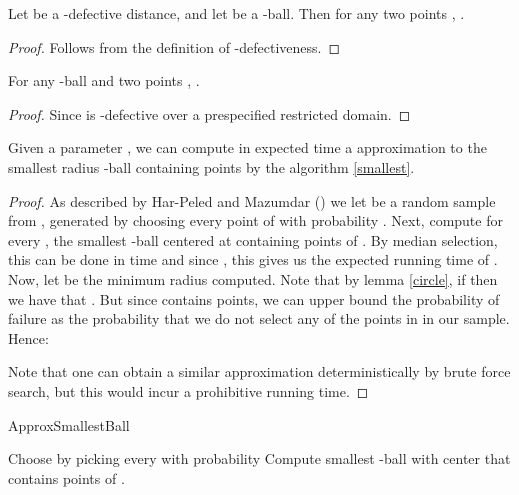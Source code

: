 \documentclass[11pt]{myclass}
\begin{document}
\begin{lemma} \label{circle}
Let  be a -defective distance, and let  be a -ball. Then for any two points , .
\end{lemma}
\begin{proof}
 Follows from the definition of  -defectiveness.
  
 \end{proof}
 
 \begin{corollary}
 For any -ball  and two points ,
 . 
 \end{corollary}
\begin{proof}
Since  is -defective over a prespecified restricted domain.
\end{proof}

\begin{lemma} \label{randommufraction}
 Given a parameter , we can compute in  expected time a  approximation to the smallest  
radius -ball containing  points by the algorithm \ref{smallest}. 
\end{lemma}
\begin{proof}
As described by Har-Peled and Mazumdar (\cite{smallestdisk}) we let  be a random sample from , generated by choosing every point of  with probability . Next, compute for every , the
smallest -ball centered at  containing  points of . By median selection, this can be done in  time and since , this gives us
the expected running time of . Now, let  be the minimum radius computed.
Note that by lemma \ref{circle}, if  then we have that .
 But since  contains  points, we can upper bound the probability of
 failure as the probability that we do not select any of the  points in  in our
sample. Hence:



Note that one can obtain a similar approximation deterministically by brute force search, but this would incur a prohibitive
 running time.
\end{proof}

\begin{algorithm}
  \caption{ApproxSmallestBall}
  \begin{algorithmic}
  	\STATE  
    \STATE Choose  by picking every  with probability 
    \STATE  
    \STATE 
    \FORALL {}     	
    	\STATE Compute smallest -ball  with center  that contains  points of .
    	\IF{ }
    	  \STATE 
    	  \STATE 
    	\ENDIF 
    \ENDFOR 
    \RETURN 
  \end{algorithmic}
  \label{smallest}
\end{algorithm}
\end{document}
